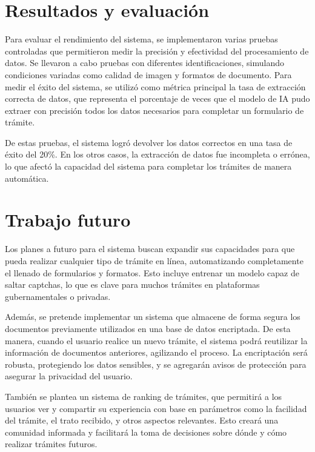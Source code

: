 \documentclass[a4paper,12pt]{article}
\begin{document}
\section{Resultados y evaluación}
Para evaluar el rendimiento del sistema, se implementaron varias pruebas controladas que permitieron medir la precisión y efectividad del procesamiento de datos. Se llevaron a cabo pruebas con diferentes identificaciones, simulando condiciones variadas como calidad de imagen y formatos de documento. Para medir el éxito del sistema, se utilizó como métrica principal la tasa de extracción correcta de datos, que representa el porcentaje de veces que el modelo de IA pudo extraer con precisión todos los datos necesarios para completar un formulario de trámite.

De estas pruebas, el sistema logró devolver los datos correctos en una tasa de éxito del 20\%. En los otros casos, la extracción de datos fue incompleta o errónea, lo que afectó la capacidad del sistema para completar los trámites de manera automática.

\section{Trabajo futuro}
Los planes a futuro para el sistema buscan expandir sus capacidades para que pueda realizar cualquier tipo de trámite en línea, automatizando completamente el llenado de formularios y formatos. Esto incluye entrenar un modelo capaz de saltar captchas, lo que es clave para muchos trámites en plataformas gubernamentales o privadas.

Además, se pretende implementar un sistema que almacene de forma segura los documentos previamente utilizados en una base de datos encriptada. De esta manera, cuando el usuario realice un nuevo trámite, el sistema podrá reutilizar la información de documentos anteriores, agilizando el proceso. La encriptación será robusta, protegiendo los datos sensibles, y se agregarán avisos de protección para asegurar la privacidad del usuario.

También se plantea un sistema de ranking de trámites, que permitirá a los usuarios ver y compartir su experiencia con base en parámetros como la facilidad del trámite, el trato recibido, y otros aspectos relevantes. Esto creará una comunidad informada y facilitará la toma de decisiones sobre dónde y cómo realizar trámites futuros.

\newpage


\end{document}
